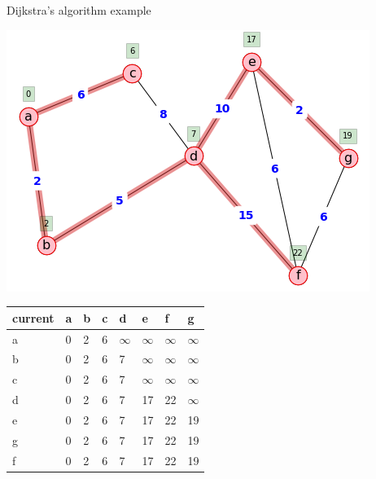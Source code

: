\begin{example}{Dijkstra's algorithm example}{}
\begin{minipage}{0.5\textwidth}
\includegraphics[scale = 0.5]{graph-theory-graphics/dijkstra8.png} 
\end{minipage}
\begin{minipage}{0.5\textwidth}
 \begin{tabular}{|l|l|l|l|l|l|l|l|}
    \hline
        current & a & b & c & d & e & f & g \\ \hline
        a & 0 & 2 & 6 & $\infty$ & $\infty$ & $\infty$& $\infty$  \\ \hline
        b & 0 & 2 & 6 & 7 & $\infty$ & $\infty$ & $\infty$ \\ \hline
        c & 0 & 2 & 6 & 7 & $\infty$ & $\infty$ & $\infty$  \\ \hline
        d & 0 & 2 & 6 & 7 & 17 & 22 & $\infty$ \\ \hline
        e & 0 & 2 & 6 & 7 & 17 & 22 & 19 \\ \hline
        g & 0 & 2 & 6 & 7 & 17 & 22 & 19  \\ \hline
        f & 0 & 2 & 6 & 7 & 17 & 22 & 19  \\ \hline
    \end{tabular}
\end{minipage}\\


\end{example}
